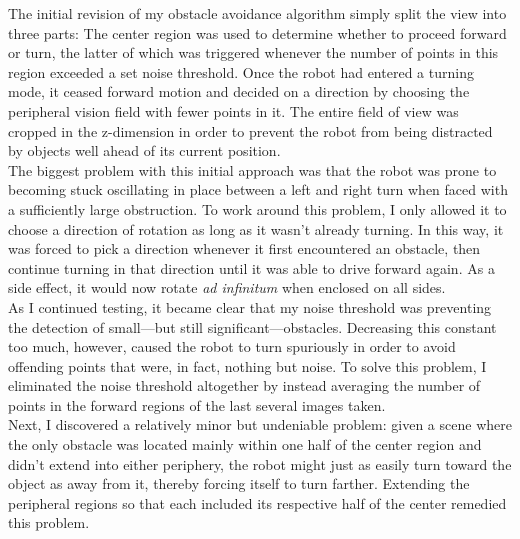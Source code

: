 \documentclass[12pt]{report}
\begin{document}
The initial revision of my obstacle avoidance algorithm simply split the view into three parts:  The center region was used to determine whether to proceed forward or turn, the latter of which was triggered whenever the number of points in this region exceeded a set noise threshold.  Once the robot had entered a turning mode, it ceased forward motion and decided on a direction by choosing the peripheral vision field with fewer points in it.  The entire field of view was cropped in the z-dimension in order to prevent the robot from being distracted by objects well ahead of its current position. \\
The biggest problem with this initial approach was that the robot was prone to becoming stuck oscillating in place between a left and right turn when faced with a sufficiently large obstruction.  To work around this problem, I only allowed it to choose a direction of rotation as long as it wasn't already turning.  In this way, it was forced to pick a direction whenever it first encountered an obstacle, then continue turning in that direction until it was able to drive forward again.  As a side effect, it would now rotate \textit{ad infinitum} when enclosed on all sides. \\
As I continued testing, it became clear that my noise threshold was preventing the detection of small---but still significant---obstacles.  Decreasing this constant too much, however, caused the robot to turn spuriously in order to avoid offending points that were, in fact, nothing but noise.  To solve this problem, I eliminated the noise threshold altogether by instead averaging the number of points in the forward regions of the last several images taken. \\
Next, I discovered a relatively minor but undeniable problem: given a scene where the only obstacle was located mainly within one half of the center region and didn't extend into either periphery, the robot might just as easily turn toward the object as away from it, thereby forcing itself to turn farther.  Extending the peripheral regions so that each included its respective half of the center remedied this problem. \\
\end{document}

